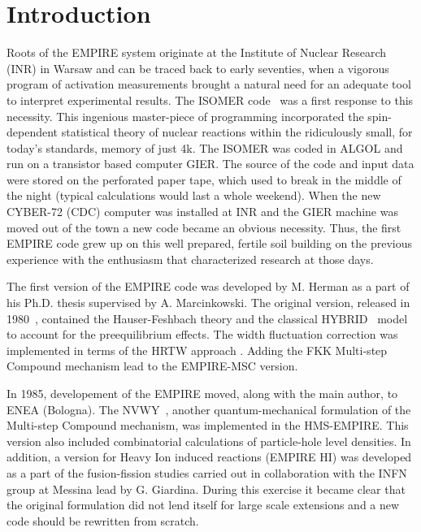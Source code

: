 \section{Introduction}

Roots of the EMPIRE system originate at the Institute of Nuclear Research
(INR) in Warsaw and can be traced back to early seventies, when a vigorous
program of activation measurements brought a natural need for an adequate
tool to interpret experimental results. The ISOMER code~\cite{Grochulski:73}
was a first response to this necessity. This ingenious master-piece of
programming incorporated the spin-dependent statistical theory of nuclear
reactions within the ridiculously small, for today's standards, memory of
just 4k. The ISOMER was coded in ALGOL and run on a transistor based
computer GIER. The source of the code and input data were stored on the
perforated paper tape, which used to break in the middle of the night
(typical calculations would last a whole weekend). When the new CYBER-72
(CDC) computer was installed at INR and the GIER machine was moved out of
the town a new code became an obvious necessity. Thus, the first EMPIRE code
grew up on this well prepared, fertile soil building on the previous
experience with the enthusiasm that characterized research at those days.

The first version of the EMPIRE code was developed by M. Herman as a part of
his Ph.D. thesis supervised by A. Marcinkowski. The original version,
released in 1980~\cite{EMPIRE-I}, contained the Hauser-Feshbach theory and
the classical HYBRID~\cite{hybrid, hybrid1, hybrid2, hybrid3} model to
account for the preequilibrium effects. The width fluctuation correction was
implemented in terms of the HRTW approach \cite{HRTW,HHM}. Adding the FKK
Multi-step Compound mechanism \cite{FKK} lead to the EMPIRE-MSC version.

In 1985, developement of the EMPIRE moved, along with the main author, to
ENEA (Bologna). The NVWY~\cite{NVWY}, another quantum-mechanical formulation
of the Multi-step Compound mechanism, was implemented in the HMS-EMPIRE.
This version also included combinatorial calculations of particle-hole level
densities. In addition, a version for Heavy Ion induced reactions (EMPIRE
HI) was developed as a part of the fusion-fission studies carried out in
collaboration with the INFN group at Messina lead by G. Giardina. During
this exercise it became clear that the original formulation did not lend
itself for large scale extensions and a new code should be rewritten from
scratch.

